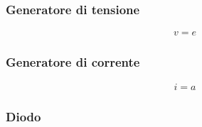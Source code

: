 \documentclass[letterpaper,10pt,italian]{jupyterBook}
\begin{document}
\subsubsection{Generatore di tensione}
\label{\detokenize{ch/electromagnetism/circuits-electric:generatore-di-tensione}}\label{\detokenize{ch/electromagnetism/circuits-electric:physics-hs-electromagnetism-circuits-electric-components-generator-v}}\begin{equation*}
\begin{split}v = e\end{split}
\end{equation*}

\subsubsection{Generatore di corrente}
\label{\detokenize{ch/electromagnetism/circuits-electric:generatore-di-corrente}}\label{\detokenize{ch/electromagnetism/circuits-electric:physics-hs-electromagnetism-circuits-electric-components-generator-i}}\begin{equation*}
\begin{split}i = a\end{split}
\end{equation*}

\subsubsection{Diodo}
\label{\detokenize{ch/electromagnetism/circuits-electric:diodo}}\label{\detokenize{ch/electromagnetism/circuits-electric:physics-hs-electromagnetism-circuits-electric-components-diode}}
\sphinxAtStartPar
{}
\end{document}
